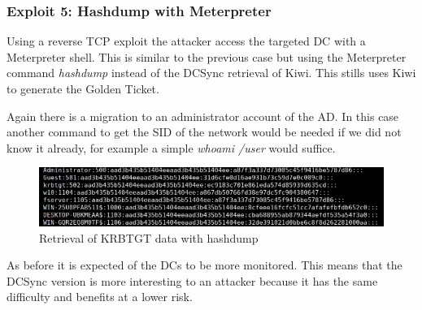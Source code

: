 \subsubsection{Exploit 5: Hashdump with Meterpreter}
Using a reverse TCP exploit the attacker access the targeted DC with a Meterpreter shell. This is similar to the previous case but using the Meterpreter command \textit{hashdump} instead of the DCSync retrieval of Kiwi\cite{pentestlab}. This stills uses Kiwi to generate the Golden Ticket.
\linej

\linej
Again there is a migration to an administrator account of the AD. In this case another command to get the SID of the network would be needed if we did not know it already, for example a simple \textit{whoami /user} would suffice.
\linej

\begin{figure}[H]
	\centering
	\includegraphics[width=\textwidth]{figuras/hashdump.png}
	\caption{Retrieval of KRBTGT data with hashdump}
\end{figure}
\linej
As before it is expected of the DCs to be more monitored. This means that the DCSync version is more interesting to an attacker because it has the same difficulty and benefits at a lower risk.

